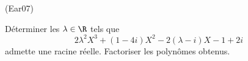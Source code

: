 \begin{tiny}(Ear07)\end{tiny} Déterminer les $\lambda\in \R$ tels que 
\[
  2\lambda^2 X^3 + (1-4i)X^2 -2(\lambda -i)X -1 +2i
\]
admette une racine réelle. Factoriser les polynômes obtenus.
